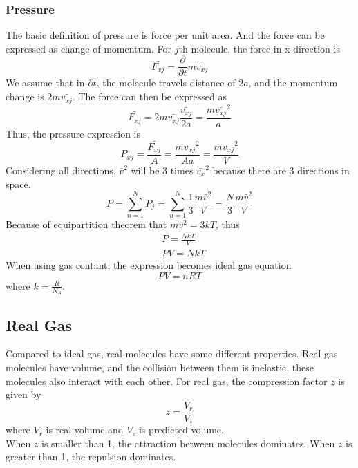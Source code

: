 \documentclass[letterpaper]{article}
\begin{document}
\subsubsection*{Pressure}
The basic definition of pressure is force per unit area. And the force can be expressed as change of momentum.
For $j$th molecule, the force in x-direction is
\begin{equation*}
    \bar{F_{xj}}=\frac{\partial}{\partial t}m\bar{v_{xj}}
\end{equation*}
We assume that in $\partial t$, the molecule travels distance of $2a$, and the momentum change is $2m\bar{v_{xj}}$.
The force can then be expressed as
\begin{equation*}
    \bar{F_{xj}}=2m\bar{v_{xj}}\frac{\bar{v_{xj}}}{2a}=\frac{m\bar{v_{xj}}^2}{a}
\end{equation*}
Thus, the pressure expression is
\begin{equation*}
    P_{xj}=\frac{\bar{F_{xj}}}{A}=\frac{m\bar{v_{xj}}^2}{Aa}=\frac{m\bar{v_{xj}}^2}{V}
\end{equation*}
Considering all directions, $\bar{v}^2$ will be 3 times $\bar{v_x}^2$ because there are 3 directions in space.
\begin{equation*}
    P=\sum_{n=1}^{N}P_j=\sum_{n=1}^{N}\frac{1}{3}\frac{m\bar{v}^2}{V}=\frac{N}{3}\frac{m\bar{v}^2}{V}
\end{equation*}
Because of equipartition theorem that $mv^2=3kT$, thus
\begin{equation*}
    \begin{aligned}
        &P=\frac{NkT}{V}\\
        &PV=NkT
    \end{aligned}
\end{equation*}
When using gas contant, the expression becomes ideal gas equation
\begin{equation*}
    PV=nRT
\end{equation*}
where $k=\frac{R}{N_A}$.
\subsection*{Real Gas}
Compared to ideal gas, real molecules have some different properties. Real gas molecules have volume, and the collision
between them is inelastic, these molecules also interact with each other.
For real gas, the compression factor $z$ is given by
\begin{equation*}
    z=\frac{V_r}{V_\circ}
\end{equation*}
where $V_r$ is real volume and $V_\circ$ is predicted volume.\\
When $z$ is smaller than 1, the attraction between molecules dominates. When $z$ is greater than 1, the repulsion dominates.
\end{document}
